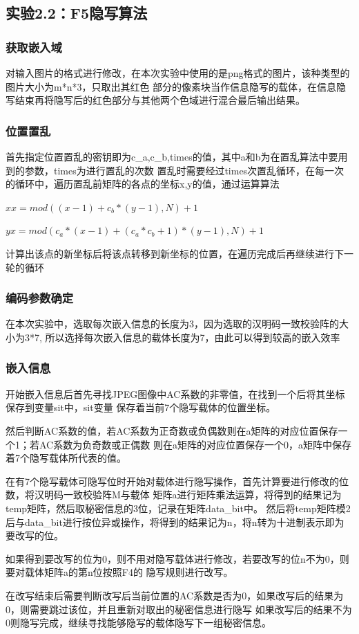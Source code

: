 \documentclass[a4paper,11pt,UTF8]{ctexart}
\begin{document}
    \subsection{实验2.2：F5隐写算法}
      \subsubsection{获取嵌入域}
        对输入图片的格式进行修改，在本次实验中使用的是png格式的图片，该种类型的图片大小为m*n*3，只取出其红色
        部分的像素块当作信息隐写的载体，在信息隐写结束再将隐写后的红色部分与其他两个色域进行混合最后输出结果。
      \subsubsection{位置置乱}
        首先指定位置置乱的密钥即为c\_a,c\_b,times的值，其中a和b为在置乱算法中要用到的参数，times为进行置乱的次数
        置乱时需要经过times次置乱循环，在每一次的循环中，遍历置乱前矩阵的各点的坐标x,y的值，通过运算算法\par
        $xx=mod((x-1)+c_b*(y-1),N)+1$ \par 
        $yx=mod(c_a*(x-1)+(c_a*c_b+1)*(y-1),N)+1$\par
        计算出该点的新坐标后将该点转移到新坐标的位置，在遍历完成后再继续进行下一轮的循环
      \subsubsection{编码参数确定}
        在本次实验中，选取每次嵌入信息的长度为3，因为选取的汉明码一致校验阵的大小为3*7,
        所以选择每次嵌入信息的载体长度为7，由此可以得到较高的嵌入效率
        
      \subsubsection{嵌入信息}
        开始嵌入信息后首先寻找JPEG图像中AC系数的非零值，在找到一个后将其坐标保存到变量sit中，sit变量
        保存着当前7个隐写载体的位置坐标。\par
        然后判断AC系数的值，若AC系数为正奇数或负偶数则在a矩阵的对应位置保存一个1；若AC系数为负奇数或正偶数
        则在a矩阵的对应位置保存一个0，a矩阵中保存着7个隐写载体所代表的值。\par
        在有7个隐写载体可隐写位时开始对载体进行隐写操作，首先计算要进行修改的位数，将汉明码一致校验阵M与载体
        矩阵a进行矩阵乘法运算，将得到的结果记为temp矩阵，然后取秘密信息的3位，记录在矩阵data\_bit中。
        然后将temp矩阵模2后与data\_bit进行按位异或操作，将得到的结果记为n，将n转为十进制表示即为要改写的位。\par
        如果得到要改写的位为0，则不用对隐写载体进行修改，若要改写的位n不为0，则要对载体矩阵a的第n位按照F4的
        隐写规则进行改写。\par
        在改写结束后需要判断改写后当前位置的AC系数是否为0，如果改写后的结果为0，则需要跳过该位，并且重新对取出的秘密信息进行隐写
        如果改写后的结果不为0则隐写完成，继续寻找能够隐写的载体隐写下一组秘密信息。
\end{document}
